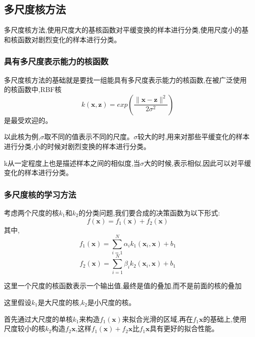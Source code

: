 \documentclass[UTF8,a4paper]{ctexart}
\begin{document}
        \subsection{多尺度核方法}
        多尺度核方法,使用尺度大的基核函数对平缓变换的样本进行分类,使用尺度小的基和核函数对剧烈变化的样本进行分类。

            \subsubsection{具有多尺度表示能力的核函数}
            多尺度核方法的基础就是要找一组能具有多尺度表示能力的核函数,在被广泛使用的核函数中,RBF核
            \begin{equation}
                k(\bm x ,\bm z) = exp(\frac{\|\bm x - \bm z\|^2}{2\sigma^2})
            \end{equation}
            是最受欢迎的。

            以此核为例,$\sigma$取不同的值表示不同的尺度。$\sigma$较大的时,用来对那些平缓变化的样本进行分类,小的时候对剧烈变换的样本进行分类。

            {\color{blue}k从一定程度上也是描述样本之间的相似度,当$\sigma$大的时候,表示相似,因此可以对平缓变化的样本进行分类。}

            \subsubsection{多尺度核的学习方法}

            考虑两个尺度的核$k_1$和$k_2$的分类问题,我们要合成的决策函数为以下形式:
            \begin{equation}
                f(\bm x) = f_1(\bm x) + f_2(\bm x)
            \end{equation}
            其中,
            \begin{equation}
                f_1(\bm x) = \sum_{i = 1}^N \alpha_ik_1(\bm x_i , \bm x) + b_1
            \end{equation}
            \begin{equation}
                f_2(\bm x) = \sum_{i = 1}^N \beta_ik_2(\bm x_i , \bm x) + b_1
            \end{equation}

            {\color{blue}这里一个尺度的核函数表示一个输出值,最终是值的叠加,而不是前面的核的叠加}

            这里假设$k_1$是大尺度的核,$k_2$是小尺度的核。

            首先通过大尺度的单核$k_1$来构造$f_1(\bm x)$来拟合光滑的区域,再在$f_1{\bm x}$的基础上,使用尺度较小的核$k_2$构造$f_2{\bm x}$,这样$f_1(\bm x) + f_2{\bm x}$比$f_1{\bm x}$具有更好的拟合性能。
\end{document}
